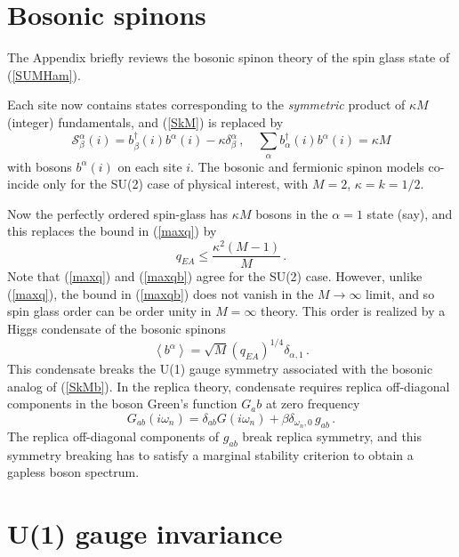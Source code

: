 \documentclass[aps,prx,preprint,onecolumn,citeautoscript,superscriptaddress,nofootinbib,
eqsecnum]{revtex4}
\newcommand{\beq}{\begin{equation}}
\newcommand{\eeq}{\end{equation}}
\begin{document}
{\appendix

\section{Bosonic spinons}
\label{app:bosons}

The Appendix briefly reviews the bosonic spinon theory of the spin glass state \cite{GPS00,GPS01} of (\ref{SUMHam}).

Each site now contains states corresponding to the {\it symmetric\/} product of $\kappa M$ (integer) fundamentals, and (\ref{SkM}) is replaced by
\beq
\mathcal{S}_{\beta}^\alpha (i) = b_\beta^\dagger (i) b^\alpha (i) - \kappa \delta^{\alpha}_{\beta} \,,\quad \sum_\alpha  b_\alpha^\dagger (i) b^\alpha (i) = \kappa M \label{SkMb}
\eeq
with bosons $b^\alpha (i)$ on each site $i$.
The bosonic and fermionic spinon models co-incide only for the SU(2) case of physical interest, with $M=2$, $\kappa = k = 1/2$.

Now the perfectly ordered spin-glass has $\kappa M$ bosons in the $\alpha = 1$ state (say), and this replaces the bound in (\ref{maxq}) by
\beq
q_{EA} \leq \frac{\kappa^2 (M-1)}{M} \,. \label{maxqb}
\eeq
Note that (\ref{maxq}) and (\ref{maxqb}) agree for the SU(2) case. However, unlike (\ref{maxq}), the bound in (\ref{maxqb}) does not vanish in the $M \rightarrow \infty$ limit, and so spin glass order can be order unity in $M=\infty$ theory. This order is realized by a Higgs condensate of the bosonic spinons \cite{GPS00,GPS01}
\beq
\left\langle b^\alpha \right\rangle =  \sqrt{M} \left( q_{EA} \right)^{1/4} \delta_{\alpha,1} \,.
\eeq
This condensate breaks the U(1) gauge symmetry associated with the bosonic analog of (\ref{SkMb}). In the replica theory, condensate requires replica off-diagonal components in the boson Green's function $G_ab$ at zero frequency \cite{GPS00,GPS01}
\beq
G_{ab} (i \omega_n) = \delta_{ab} G(i \omega_n) + \beta \delta_{\omega_n, 0} \,g_{ab}\,.
\eeq
The replica off-diagonal components of $g_{ab}$ break replica symmetry, and this symmetry breaking has to satisfy a marginal stability criterion to obtain a gapless boson spectrum.

\section{U(1) gauge invariance}
\label{app:U1}

}
\end{document}
